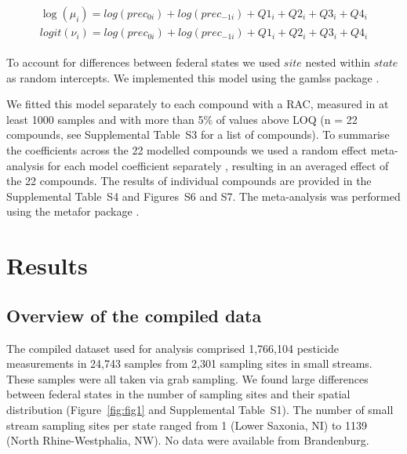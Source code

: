 \documentclass[journal=esthag,manuscript=article]{achemso}
\begin{document}
\begin{align}
\begin{split}
\log(\mu_{i}) = log(prec_{0 i}) + log(prec_{-1 i}) + Q1_{i} + Q2_{i}+Q3_{i}+Q4_{i}\\
logit(\nu_{i}) = log(prec_{0 i}) + log(prec_{-1 i}) + Q1_{i} + Q2_{i}+Q3_{i}+Q4_{i}
\end{split}
\label{eqn:eqn4}
\end{align}

To account for differences between federal states we used $site$ nested within $state$ as random intercepts.
We implemented this model using the gamlss package \cite{stasinopoulos_generalized_2007}. 

We fitted this model separately to each compound with a RAC, measured in at least 1000 samples and with more than 5\% of values above LOQ (n = 22 compounds, see Supplemental Table~S3 for a list of compounds). 
To summarise the coefficients across the 22 modelled compounds we used a random effect meta-analysis for each model coefficient separately \citep{harrison_getting_2011}, resulting in an averaged effect of the 22 compounds.
The results of individual compounds are provided in the Supplemental Table~S4 and Figures~S6 and S7.
The meta-analysis was performed using the metafor package \citep{Viechtbauer_2010}. 



\section{Results}
\subsection{Overview of the compiled data}

The compiled dataset used for analysis comprised 1,766,104 pesticide measurements in 24,743 samples from 2,301 sampling sites in small streams.  %
These samples were all taken via grab sampling.  
We found large differences between federal states in the number of sampling sites and their spatial distribution (Figure~\ref{fig:fig1} and Supplemental Table~S1). 
The number of small stream sampling sites per state ranged from 1 (Lower Saxonia, NI) to 1139 (North Rhine-Westphalia, NW).
No data were available from Brandenburg. 
\end{document}
